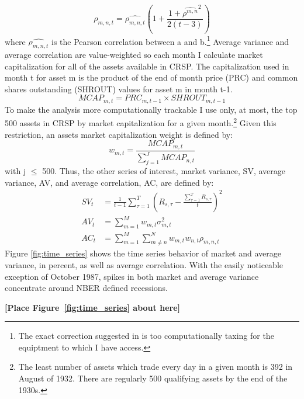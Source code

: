 \begin{equation}
	\rho_{m,n,t} = \widehat{\rho_{m,n,t}}\left(1 + \frac{1+\widehat{\rho^{m,n}}^{2}}{2(t-3)}\right)
\end{equation}
where $\widehat{\rho_{m,n,t}}$ is the Pearson correlation between a and b.\footnote{The exact correction suggested in \cite{olkin_1958} is too computationally taxing for the equiptment to which I have access.} Average variance and average correlation are value-weighted so each month I calculate market capitalization for all of the assets available in CRSP. The capitalization used in month t for asset m is the product of the end of month price (PRC) and common shares outstanding (SHROUT) values for asset m in month t-1. 
\begin{equation}
MCAP_{m,t} = PRC_{m,t-1}\times SHROUT_{m,t-1}
\end{equation}
To make the analysis more computationally trackable I use only, at most, the top 500 assets in CRSP by market capitalization for a given month.\footnote{The least number of assets which trade every day in a given month is 392 in August of 1932. There are regularly 500 qualifying assets by the end of the 1930s.} Given this restriction, an assets market capitalization weight is defined by:
\begin{equation}
w_{m,t} = \frac{MCAP_{m,t}}{\sum_{j=1}^{J}MCAP_{n,t}}
\end{equation}
with j $\leq$ 500. Thus, the other series of interest, market variance, SV, average variance, AV, and average correlation, AC, are defined by:
\begin{align}
	SV_{t} &= \frac{1}{t-1}\sum_{\tau = 1}^{T} \left(R_{s,\tau} - \frac{\sum_{\tau = 1}^{T} R_{s,\tau}}{t}\right)^{2}\\
	AV_{t} &= \sum_{m=1}^{M} w_{m,t}\sigma^{2}_{m,t}\\
	AC_{t} &= \sum_{m=1}^{M}\sum_{m \neq n}^{N}w_{m,t}w_{n,t}\rho_{m,n,t}
\end{align}
Figure \ref{fig:time_series} shows the time series behavior of market and average variance, in percent, as well as
average correlation. With the easily noticeable exception of October 1987, spikes in both market and average variance concentrate around NBER defined recessions.\\
\bigskip
\centerline{\bf [Place Figure~\ref{fig:time_series} about here]}
\bigskip

